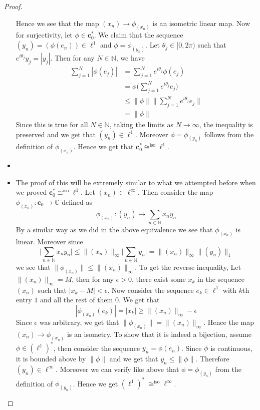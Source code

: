 \begin{proof}
\begin{itemize}[]
      Hence we see that the map $(x_n) \to \phi_{(x_n)}$ is an
      isometric linear map. Now for surjectivity, let $\phi \in
      \textbf{c}_0^{*}$. We claim that the sequence $(y_n) =
      (\phi(e_n)) \in \ell^1$ and $\phi = \phi_{(y_n)}$. Let
      $\theta_j \in [0, 2\pi)$ such that $e^{ i \theta_j}y_j =
      |y_j|$. Then for any $N \in \mathbb{N}$, we have
      \begin{align*}
        \sum_{j = 1}^{N} |\phi(e_j)| &=  \sum_{j = 1}^{N} e^{i
        \theta_j}\phi(e_j) \\
        &= \phi \Big(\sum_{j = 1}^{N} e^{i \theta_j} e_j \Big) \\
        &\le \|\phi\| \Big \| \sum_{j = 1}^{N} e^{i \theta_j} e_j \Big \| \\
        &= \|\phi\|
      \end{align*}
      Since this is true for all $N \in \mathbb{N}$, taking the
      limits as $N \to \infty$, the inequality is preserved and we
      get that $(y_n) \in \ell^1$. Moreover $\phi = \phi_{(y_n)}$
      follows from the definition of $ \phi_{(x_n)}$. Hence we get
      that $  \textbf{c}_0^{*} \cong^{\textrm{iso}} \ell^1$.
    \item
    \item The proof of this will be extremely similar to what we
      attempted before when we proved $\textbf{c}_0^{*}
      \cong^{\textrm{iso}} \ell^1$. Let $(x_n) \in \ell^\infty$. Then
      consider the map $\phi_{(x_n)}: \textbf{c}_0 \to \mathbb{C}$
      defined as $$\phi_{(x_n)}: (y_n) \to \sum_{n \in \mathbb{N}} x_ny_n$$
      By a similar way as we did in the above equivalence we see that
      $\phi_{(x_n)}$ is linear. Moreover since \[
        \Big | \sum_{n \in \mathbb{N}} x_n y_n \Big | \le
        \|(x_n)\|_\infty \Big | \sum_{n \in \mathbb{N}} y_n \Big | =
        \|(x_n)\|_\infty \|(y_n)\|_1
      \]
      we see that $\|\phi_{(x_n)}\| \le \|(x_n)\|_{\infty}$. To get
      the reverse inequality, Let $\|(x_n)\|_\infty = M$, then for
      any $\epsilon >0$, there exist some $x_k$ in the sequence
      $(x_n)$ such that $|x_k - M| < \epsilon$. Now consider the
      sequence $e_k \in \ell^1$ with $k$th entry $1$ and all the rest
      of them $0$. We get that \[
        |\phi_{(x_n)}(e_k)| = |x_k| \ge \|(x_n)\|_\infty - \epsilon
      \]
      Since $\epsilon$ was arbitrary, we get that $\|\phi_{(x_n)}\| =
      \|(x_n)\|_{\infty}$. Hence the map $(x_n) \to \phi_{(x_n)}$ is
      an isometry. To show that it is indeed a bijection, assume
      $\phi \in (\ell^1)^{*}$, then consider the sequence $y_n =
      \phi(e_n)$. Since $\phi$ is continuous, it is bounded above by
      $ \|\phi\|$ and we get that $ y_n \le \|\phi\|$. Therefore
      $(y_n) \in \ell^\infty$. Moreover we can verify like above that
      $\phi = \phi_{(y_n)}$ from the definition of $\phi_{(y_n)}$.
      Hence we get $(\ell^1)^{*} \ \cong^{\textrm{iso}} \ell^\infty$.
  \end{itemize}
\end{proof}

